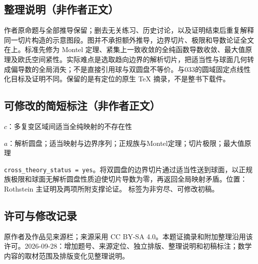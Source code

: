 \documentclass[UTF8,11pt]{ctexart}
\theoremstyle{definition}
\begin{document}
\subsection*{整理说明（非作者正文）}
作者原命题与全部推导保留；删去无关练习、历史讨论，以及证明结束后重复解释同一切片构造的示意图段。图并不承担额外推导，边界切片、极限和导数论证全文在上。标准先修为 Montel 定理、紧集上一致收敛的全纯函数导数收敛、最大值原理及欧氏空间紧性。实际难点是选取趋向边界的解析切片，把适当性与球面几何转成偏导数的全局消失；不是直接引用球与双圆盘不等价。与033的圆域固定点线性化目标及证明不同。保留的是有定位的原生 TeX 摘录，不是整书下载件。
\subsection*{可修改的简短标注（非作者正文）}
$c$：多复变区域间适当全纯映射的不存在性

$a$：解析圆盘；适当映射与边界序列；正规族与Montel定理；切片极限；最大值原理

\texttt{cross\_theory\_status = yes}。将双圆盘的边界切片通过适当性送到球面，以正规族极限和球面无解析圆盘性质迫使切片导数为零，再返回全局映射矛盾。位置：Rothstein 主证明及两项所附支撑论证。
标签为非穷尽、可修改初稿。
\subsection*{许可与修改记录}
原作者及作品见来源栏；来源采用 CC BY-SA 4.0。本题证摘录和附加整理沿用该许可。2026-09-28：增加题号、来源定位、独立排版、整理说明和初稿标注；数学内容的取材范围及排版变化见整理说明。
\end{document}
